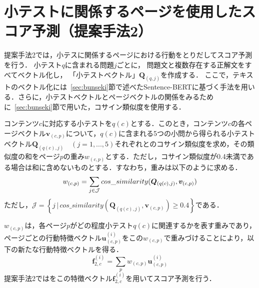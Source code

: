 \documentclass[a4paper,12pt]{ltjsreport}
\begin{document}
\section{小テストに関係するページを使用したスコア予測（提案手法2）}\label{sec:2}

提案手法2では，小テスに関係するページにおける行動をとりだしてスコア予測を行う．
小テスト$q$に含まれる問題$j$ごとに，
問題文と複数存在する正解文をすべてベクトル化し，
「小テストベクトル」$\bm{Q}_{(q,j)}$を作成する．
ここで，テキストのベクトル化には~\ref{sec:bunseki}節で述べたSentence-BERTに基づく手法を用いる．さらに，小テストベクトルとページベクトルの関係をみるために~\ref{sec:bunseki}節で用いた，コサイン類似度を使用する．


コンテンツ$c$に対応する小テストを$q(c)$とする．このとき，コンテンツ$c$の各ページベクトル$\bm{v}_{(c,p)}$について，$q(c)$に含まれる5つの小問から得られる小テストベクトル$\bm{Q}_{(q(c),j)} \quad (j=1,...,5)$それぞれとのコサイン類似度を求め，その類似度の和をページ$p$の重み$w_{(c,p)}$とする．ただし，コサイン類似度が0.4未満である場合は和に含めないものとする．すなわち，重みは以下のように求める．
\begin{equation}
w_{(c,p)} = \sum_{j \in \mathcal{J}} cos\_similarity(\bm{Q}_{(q(c),j)}, \bm{v}_{(c,p)}) \\
\end{equation}
ただし，$\mathcal{J} = \left\{j \,|\, cos\_similarity(\bm{Q}_{(q(c),j)}, \bm{v}_{(c,p)}) \geq 0.4\right\}$である．


$w_{(c,p)}$は，各ページ$p$がどの程度小テスト$q(c)$に関連するかを表す重みであり，ページごとの行動特徴ベクトル$\bm{u}_{(c,p)}^{(i)}$をこの$w_{(c,p)}$で重みづけることにより，以下の新たな行動特徴ベクトルを得る．
\begin{equation}
\bm{f}_{2, c}^{(i)} = \sum_p w_{(c,p)} \bm{u}_{(c,p)}^{(i)}
\end{equation}
提案手法2ではをこの特徴ベクトル$\bm{f}_{2, c}^{(i)}$を用いてスコア予測を行う．
\end{document}
